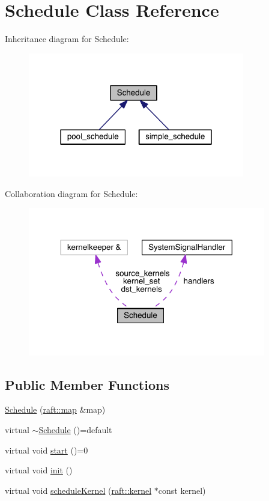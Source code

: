 \hypertarget{class_schedule}{}\section{Schedule Class Reference}
\label{class_schedule}


Inheritance diagram for Schedule\+:
\nopagebreak
\begin{figure}[H]
\begin{center}
\leavevmode
\includegraphics[width=268pt]{class_schedule__inherit__graph}
\end{center}
\end{figure}


Collaboration diagram for Schedule\+:
\nopagebreak
\begin{figure}[H]
\begin{center}
\leavevmode
\includegraphics[width=294pt]{class_schedule__coll__graph}
\end{center}
\end{figure}
\subsection*{Public Member Functions}
\begin{DoxyCompactItemize}
\item 
\hyperlink{class_schedule_ae3fcf18fa8bdbe2ac438962a324cf433}{Schedule} (\hyperlink{classraft_1_1map}{raft\+::map} \&map)
\item 
virtual \hyperlink{class_schedule_a68e52c571576866ef55cb4e891232c58}{$\sim$\+Schedule} ()=default
\item 
virtual void \hyperlink{class_schedule_ab6ad5540ecdef6b472b4e8242a47c4ee}{start} ()=0
\item 
virtual void \hyperlink{class_schedule_a5180032a0c2135507859ccf2a4eea1ab}{init} ()
\item 
virtual void \hyperlink{class_schedule_a6a722f6e76c8b8dc67874d9974b6d641}{schedule\+Kernel} (\hyperlink{classraft_1_1kernel}{raft\+::kernel} $\ast$const kernel)
\end{DoxyCompactItemize}
